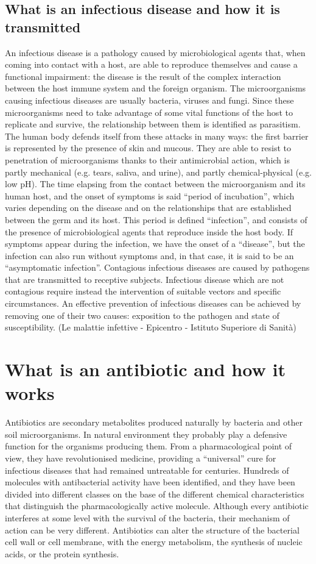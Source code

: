 \documentclass[11pt]{report}
\begin{document}
\section{What is an infectious disease and how it is transmitted}

An infectious disease is a pathology caused by microbiological agents that, when coming into contact with a host, are able to reproduce themselves and cause a functional impairment: the disease is the result of the complex interaction between the host immune system and the foreign organism.
The microorganisms causing infectious diseases are usually bacteria, viruses and fungi.
Since these microorganisms need to take advantage of some vital functions of the host to replicate and survive, the relationship between them is identified as parasitism.
The human body defends itself from these attacks in many ways: the first barrier is represented by the presence of skin and mucous.
They are able to resist to penetration of microorganisms thanks to their antimicrobial action, which is partly mechanical (e.g. tears, saliva, and urine), and partly chemical-physical (e.g. low pH).
The time elapsing from the contact between the microorganism and its human host, and the onset of symptoms is said “period of incubation”, which varies depending on the disease and on the relationships that are established between the germ and its host.
This period is defined “infection”, and consists of the presence of microbiological agents that reproduce inside the host body.
If symptoms appear during the infection, we have the onset of a “disease”, but the infection can also run without symptoms and, in that case, it is said to be an “asymptomatic infection”.
Contagious infectious diseases are caused by pathogens that are transmitted to receptive subjects.
Infectious disease which are not contagious require instead the intervention of suitable vectors and specific circumstances.
An effective prevention of infectious diseases can be achieved by removing one of their two causes: exposition to the pathogen and state of susceptibility.
(Le malattie infettive - Epicentro - Istituto Superiore di Sanità)

\chapter{What is an antibiotic and how it works}
Antibiotics are secondary metabolites produced naturally by bacteria and other soil microorganisms.
In natural environment they probably play a defensive function for the organisms producing them.
From a pharmacological point of view, they have revolutionised medicine, providing a “universal” cure for infectious diseases that had remained untreatable for centuries.
Hundreds of molecules with antibacterial activity have been identified, and they have been divided into different classes on the base of the different chemical characteristics that distinguish the pharmacologically active molecule.
Although every antibiotic interferes at some level with the survival of the bacteria, their mechanism of action can be very different.
Antibiotics can alter the structure of the bacterial cell wall or cell membrane, with the energy metabolism, the synthesis of nucleic acids, or the protein synthesis.
\end{document}
